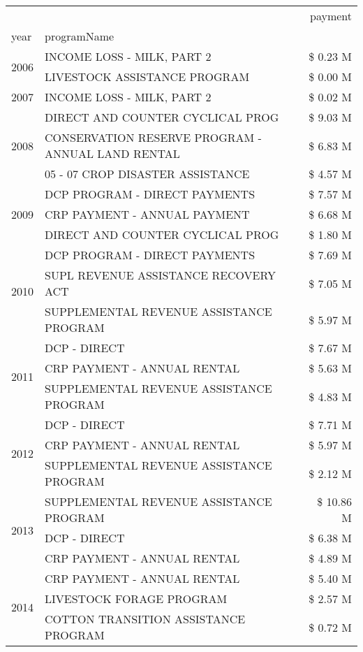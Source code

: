 \begin{tabular}{llr}
\toprule
 &  & payment \\
year & programName &  \\
\midrule
\multirow[t]{2}{*}{2006} & INCOME LOSS - MILK, PART 2 & \$ 0.23 M \\
 & LIVESTOCK ASSISTANCE PROGRAM & \$ 0.00 M \\
\cline{1-3}
2007 & INCOME LOSS - MILK, PART 2 & \$ 0.02 M \\
\cline{1-3}
\multirow[t]{3}{*}{2008} & DIRECT AND COUNTER CYCLICAL PROG & \$ 9.03 M \\
 & CONSERVATION RESERVE PROGRAM - ANNUAL LAND RENTAL & \$ 6.83 M \\
 & 05 - 07 CROP DISASTER ASSISTANCE & \$ 4.57 M \\
\cline{1-3}
\multirow[t]{3}{*}{2009} & DCP PROGRAM - DIRECT PAYMENTS & \$ 7.57 M \\
 & CRP PAYMENT - ANNUAL PAYMENT & \$ 6.68 M \\
 & DIRECT AND COUNTER CYCLICAL PROG & \$ 1.80 M \\
\cline{1-3}
\multirow[t]{3}{*}{2010} & DCP PROGRAM - DIRECT PAYMENTS & \$ 7.69 M \\
 & SUPL REVENUE ASSISTANCE RECOVERY ACT & \$ 7.05 M \\
 & SUPPLEMENTAL REVENUE ASSISTANCE PROGRAM & \$ 5.97 M \\
\cline{1-3}
\multirow[t]{3}{*}{2011} & DCP - DIRECT & \$ 7.67 M \\
 & CRP PAYMENT - ANNUAL RENTAL & \$ 5.63 M \\
 & SUPPLEMENTAL REVENUE ASSISTANCE PROGRAM & \$ 4.83 M \\
\cline{1-3}
\multirow[t]{3}{*}{2012} & DCP - DIRECT & \$ 7.71 M \\
 & CRP PAYMENT - ANNUAL RENTAL & \$ 5.97 M \\
 & SUPPLEMENTAL REVENUE ASSISTANCE PROGRAM & \$ 2.12 M \\
\cline{1-3}
\multirow[t]{3}{*}{2013} & SUPPLEMENTAL REVENUE ASSISTANCE PROGRAM & \$ 10.86 M \\
 & DCP - DIRECT & \$ 6.38 M \\
 & CRP PAYMENT - ANNUAL RENTAL & \$ 4.89 M \\
\cline{1-3}
\multirow[t]{3}{*}{2014} & CRP PAYMENT - ANNUAL RENTAL & \$ 5.40 M \\
 & LIVESTOCK FORAGE PROGRAM & \$ 2.57 M \\
 & COTTON TRANSITION ASSISTANCE PROGRAM & \$ 0.72 M \\

\end{tabular}
